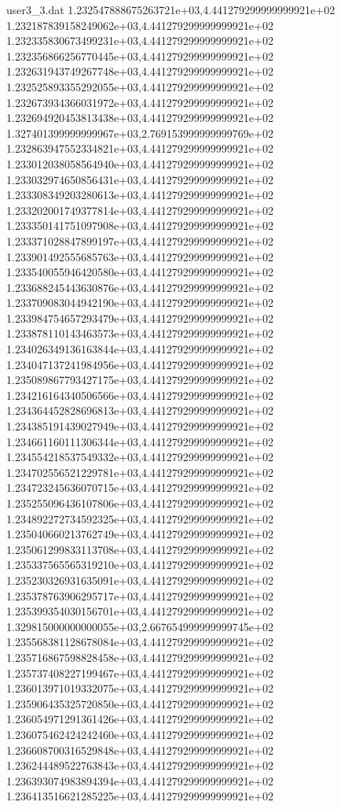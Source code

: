 \begin{filecontents}{user3_3.dat}
1.232547888675263721e+03,4.441279299999999921e+02
1.232187839158249062e+03,4.441279299999999921e+02
1.232335830673499231e+03,4.441279299999999921e+02
1.232356866256770445e+03,4.441279299999999921e+02
1.232631943749267748e+03,4.441279299999999921e+02
1.232525893355292055e+03,4.441279299999999921e+02
1.232673934366031972e+03,4.441279299999999921e+02
1.232694920453813438e+03,4.441279299999999921e+02
1.327401399999999967e+03,2.769153999999999769e+02
1.232863947552334821e+03,4.441279299999999921e+02
1.233012038058564940e+03,4.441279299999999921e+02
1.233032974650856431e+03,4.441279299999999921e+02
1.233308349203280613e+03,4.441279299999999921e+02
1.233202001749377814e+03,4.441279299999999921e+02
1.233350141751097908e+03,4.441279299999999921e+02
1.233371028847899197e+03,4.441279299999999921e+02
1.233901492555685763e+03,4.441279299999999921e+02
1.233540055946420580e+03,4.441279299999999921e+02
1.233688245443630876e+03,4.441279299999999921e+02
1.233709083044942190e+03,4.441279299999999921e+02
1.233984754657293479e+03,4.441279299999999921e+02
1.233878110143463573e+03,4.441279299999999921e+02
1.234026349136163844e+03,4.441279299999999921e+02
1.234047137241984956e+03,4.441279299999999921e+02
1.235089867793427175e+03,4.441279299999999921e+02
1.234216164340506566e+03,4.441279299999999921e+02
1.234364452828696813e+03,4.441279299999999921e+02
1.234385191439027949e+03,4.441279299999999921e+02
1.234661160111306344e+03,4.441279299999999921e+02
1.234554218537549332e+03,4.441279299999999921e+02
1.234702556521229781e+03,4.441279299999999921e+02
1.234723245636070715e+03,4.441279299999999921e+02
1.235255096436107806e+03,4.441279299999999921e+02
1.234892272734592325e+03,4.441279299999999921e+02
1.235040660213762749e+03,4.441279299999999921e+02
1.235061299833113708e+03,4.441279299999999921e+02
1.235337565565319210e+03,4.441279299999999921e+02
1.235230326931635091e+03,4.441279299999999921e+02
1.235378763906295717e+03,4.441279299999999921e+02
1.235399354030156701e+03,4.441279299999999921e+02
1.329815000000000055e+03,2.667654999999999745e+02
1.235568381128678084e+03,4.441279299999999921e+02
1.235716867598828458e+03,4.441279299999999921e+02
1.235737408227199467e+03,4.441279299999999921e+02
1.236013971019332075e+03,4.441279299999999921e+02
1.235906435325720850e+03,4.441279299999999921e+02
1.236054971291361426e+03,4.441279299999999921e+02
1.236075462424242460e+03,4.441279299999999921e+02
1.236608700316529848e+03,4.441279299999999921e+02
1.236244489522763843e+03,4.441279299999999921e+02
1.236393074983894394e+03,4.441279299999999921e+02
1.236413516621285225e+03,4.441279299999999921e+02

\end{filecontents}
